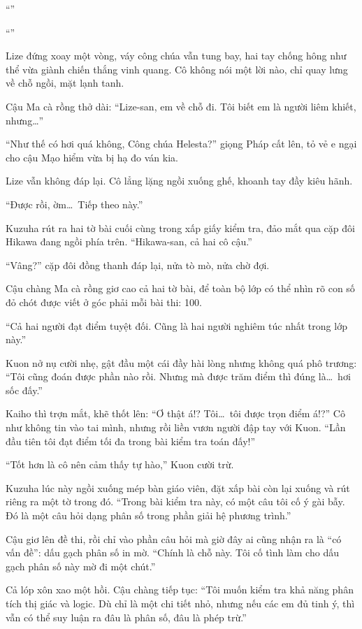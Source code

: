 \documentclass[../main.tex]{subfiles}
\begin{document}
``''

``''

Lize đứng xoay một vòng, váy công chúa vẫn tung bay, hai tay chống hông như thể vừa giành chiến thắng vinh quang. Cô không nói một lời nào, chỉ quay lưng về chỗ ngồi, mặt lạnh tanh.


Cậu Ma cà rồng thở dài: ``Lize-san, em về chỗ đi. Tôi biết em là người liêm khiết, nhưng\dots''

``Như thế có hơi quá không, Công chúa Helesta?'' giọng Pháp cất lên, tỏ vẻ e ngại cho cậu Mạo hiểm vừa bị hạ đo ván kia.

Lize vẫn không đáp lại. Cô lẳng lặng ngồi xuống ghế, khoanh tay đầy kiêu hãnh.

``Được rồi, ờm\dots\ Tiếp theo này.''

Kuzuha rút ra hai tờ bài cuối cùng trong xấp giấy kiểm tra, đảo mắt qua cặp đôi Hikawa đang ngồi phía trên.
``Hikawa-san, cả hai cô cậu.''

``Vâng?'' cặp đôi đồng thanh đáp lại, nửa tò mò, nửa chờ đợi.

Cậu chàng Ma cà rồng giơ cao cả hai tờ bài, để toàn bộ lớp có thể nhìn rõ con số đỏ chót được viết ở góc phải mỗi bài thi: 100.

``Cả hai người đạt điểm tuyệt đối. Cũng là hai người nghiêm túc nhất trong lớp này.''

Kuon nở nụ cười nhẹ, gật đầu một cái đầy hài lòng nhưng không quá phô trương: ``Tôi cũng đoán được phần nào rồi. Nhưng mà được trăm điểm thì đúng là\dots\ hơi sốc đấy.''

Kaiho thì trợn mắt, khẽ thốt lên: ``Ơ thật á!? Tôi\dots\ tôi được trọn điểm á!?'' Cô như không tin vào tai mình, nhưng rồi liền vươn người đập tay với Kuon. ``Lần đầu tiên tôi đạt điểm tối đa trong bài kiểm tra toán đấy!''

``Tốt hơn là cô nên cảm thấy tự hào,'' Kuon cười trừ.

Kuzuha lúc này ngồi xuống mép bàn giáo viên, đặt xấp bài còn lại xuống và rút riêng ra một tờ trong đó. ``Trong bài kiểm tra này, có một câu tôi cố ý gài bẫy. Đó là một câu hỏi dạng phân số trong phần giải hệ phương trình.''

Cậu giơ lên đề thi, rồi chỉ vào phần câu hỏi mà giờ đây ai cũng nhận ra là ``có vấn đề'': dấu gạch phân số in mờ. ``Chính là chỗ này. Tôi cố tình làm cho dấu gạch phân số này mờ đi một chút.''

Cả lóp xôn xao một hồi. Cậu chàng tiếp tục: ``Tôi muốn kiểm tra khả năng phân tích thị giác và logic. Dù chỉ là một chi tiết nhỏ, nhưng nếu các em đủ tinh ý, thì vẫn có thể suy luận ra đâu là phân số, đâu là phép trừ.''
\end{document}
